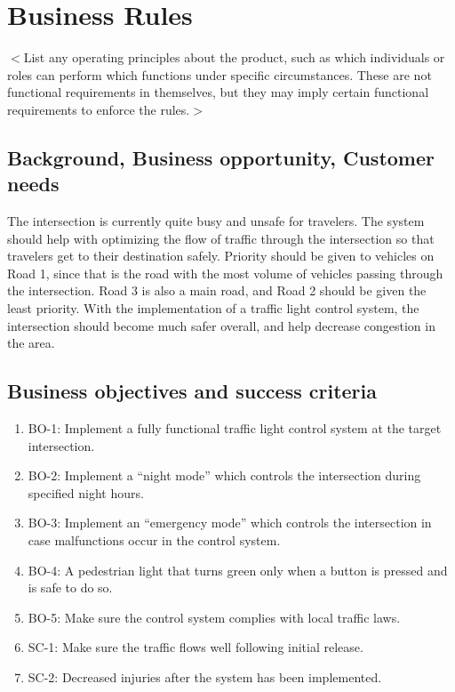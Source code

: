 \documentclass{scrreprt}
\begin{document}
\section{Business Rules}
$<$List any operating principles about the product, such as which individuals or
roles can perform which functions under specific circumstances. These are not
functional requirements in themselves, but they may imply certain functional
requirements to enforce the rules.$>$

\subsection{Background, Business opportunity, Customer needs}
The intersection is currently quite busy and unsafe for travelers. The system
should help with optimizing the flow of traffic through the intersection so that
travelers get to their destination safely. Priority should be given to vehicles
on Road 1, since that is the road with the most volume of vehicles passing
through the intersection. Road 3 is also a main road, and Road 2 should be given
the least priority. With the implementation of a traffic light control system,
the intersection should become much safer overall, and help decrease congestion
in the area.

\subsection{Business objectives and success criteria}
\begin{enumerate}
 \item BO-1: Implement a fully functional traffic light control system at the
       target intersection.
 \item BO-2: Implement a “night mode” which controls the intersection
       during specified night hours.
 \item BO-3: Implement an “emergency mode” which controls
       the intersection in case malfunctions occur in the control system.
 \item BO-4: A pedestrian light that turns green only when a button is pressed
       and is safe to do so.
 \item BO-5: Make sure the control system complies with local traffic laws.
 \item SC-1: Make sure the traffic flows well following initial release.
 \item SC-2: Decreased injuries after the system has been implemented.
\end{enumerate}
\end{document}
